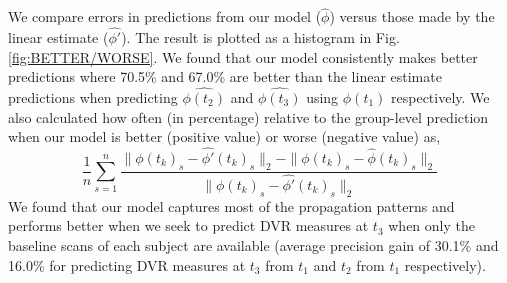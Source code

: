\documentclass{article}
\begin{document}
We compare errors in predictions 
from our model (${\hat{\phi}}$) 
versus those made by the linear estimate
(${\hat{\phi'}}$). 
The result is plotted as a histogram in Fig. \ref{fig:BETTER/WORSE}.
We found that our model consistently makes better predictions where 70.5\% and 67.0\% are better than the linear estimate
predictions when predicting ${\hat{\phi(t_2)}}$ and ${\hat{\phi(t_3)}}$ using $\phi(t_1)$ respectively.
We also calculated how often (in percentage) relative to the group-level prediction when our model is better (positive value) or worse (negative value) as, 
\begin{equation} %
\label{eqn:eq8}
    \frac{1}{n}{\sum_ {s=1}^{n} \frac{ \|{\phi(t_k)_s} - {\hat{\phi'}(t_k)_s}\|_2 - \|{\phi(t_k)_s} - {\hat{\phi}(t_k)_s} \|_2}{\|{\phi(t_k)_s} - {\hat{\phi'}(t_k)_s}\|_2}}
\end{equation}
We found that our model captures most of the propagation patterns and performs better
when we seek to predict DVR measures at $t_3$ when only the baseline scans of each subject are available (average precision gain of
30.1\% and 16.0\% for predicting DVR measures at $t_3$ from $t_1$ and $t_2$ from $t_1$ respectively).





\end{document}
